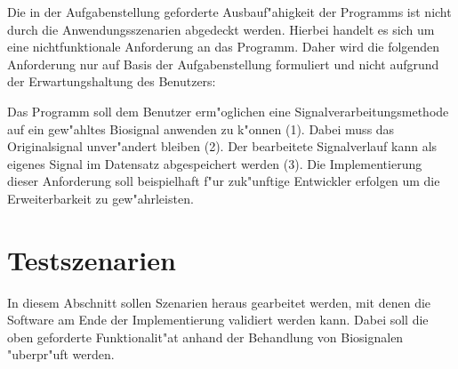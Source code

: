 Die in der Aufgabenstellung geforderte Ausbauf"ahigkeit der Programms ist nicht durch die Anwendungsszenarien abgedeckt werden.
Hierbei handelt es sich um eine nichtfunktionale Anforderung an das Programm.
Daher wird die folgenden Anforderung nur auf Basis der Aufgabenstellung formuliert und nicht aufgrund der Erwartungshaltung des Benutzers:
\begin{enumerate}[resume]
	 Das Programm soll dem Benutzer erm"oglichen eine Signalverarbeitungsmethode auf ein gew"ahltes Biosignal anwenden zu k"onnen (1).
							Dabei muss das Originalsignal unver"andert bleiben (2).
							Der bearbeitete Signalverlauf kann als eigenes Signal im Datensatz abgespeichert werden (3).
							Die Implementierung dieser Anforderung soll beispielhaft f"ur zuk"unftige Entwickler erfolgen um die Erweiterbarkeit zu gew"ahrleisten.
\end{enumerate}

\section{Testszenarien}
\label{sec:testszenarien}

In diesem Abschnitt sollen Szenarien heraus gearbeitet werden, mit denen die Software am Ende der Implementierung validiert werden kann.
Dabei soll die oben geforderte Funktionalit"at anhand der Behandlung von Biosignalen "uberpr"uft werden.

